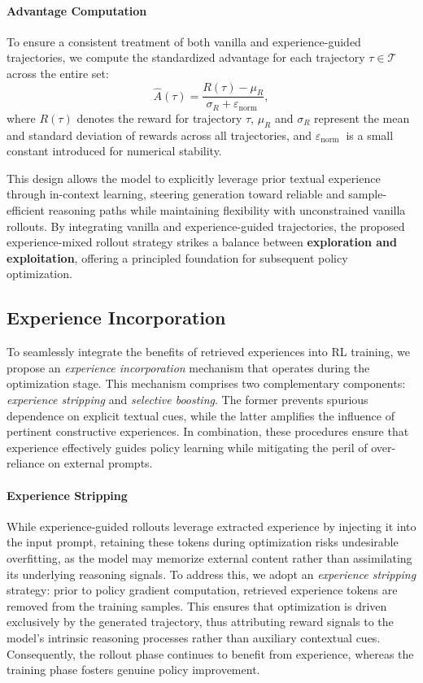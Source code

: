 \paragraph{Advantage Computation}
To ensure a consistent treatment of both vanilla and experience-guided trajectories, we compute the standardized advantage for each trajectory $\tau \in \mathcal{T}$ across the entire set:
\begin{equation}
\hat{A}(\tau)=\frac{R(\tau)-\mu_R}{\sigma_R+\varepsilon_{\text {norm }}},
\end{equation}
where $R(\tau)$ denotes the reward for trajectory $\tau$, 
$\mu_R$ and $\sigma_R$ represent the mean and standard deviation of rewards across all trajectories,
and $\varepsilon_{\text {norm }}$ is a small constant introduced for numerical stability.

This design allows the model to explicitly leverage prior textual experience through in-context learning, steering generation toward reliable and sample-efficient reasoning paths while maintaining flexibility with unconstrained vanilla rollouts. By integrating vanilla and experience-guided trajectories, the proposed experience-mixed rollout strategy strikes a balance between \textbf{exploration and exploitation}, offering a principled foundation for subsequent policy optimization.



\subsection{Experience Incorporation}
To seamlessly integrate the benefits of retrieved experiences into RL training, we propose an \emph{experience incorporation} mechanism that operates during the optimization stage. This mechanism comprises two complementary components: \emph{experience stripping} and \emph{selective boosting}. The former prevents spurious dependence on explicit textual cues, while the latter amplifies the influence of pertinent constructive experiences. In combination, these procedures ensure that experience effectively guides policy learning while mitigating the peril of over-reliance on external prompts.


\paragraph{Experience Stripping}



While experience-guided rollouts leverage extracted experience by injecting it into the input prompt, retaining these tokens during optimization risks undesirable overfitting, as the model may memorize external content rather than assimilating its underlying reasoning signals. To address this, we adopt an \emph{experience stripping} strategy: prior to policy gradient computation, retrieved experience tokens are removed from the training samples. This ensures that optimization is driven exclusively by the generated trajectory, thus attributing reward signals to the model’s intrinsic reasoning processes rather than auxiliary contextual cues. Consequently, the rollout phase continues to benefit from experience, whereas the training phase fosters genuine policy improvement.



